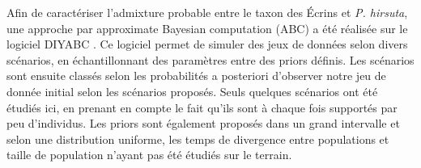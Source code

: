 Afin de caractériser l'admixture probable entre le taxon des Écrins et \textit{P. hirsuta}, une approche par approximate Bayesian computation (ABC) a été réalisée sur le logiciel DIYABC \citep{Cornuet2014}. 
Ce logiciel permet de simuler des jeux de données selon divers scénarios, en échantillonnant des paramètres entre des priors définis. 
Les scénarios sont ensuite classés selon les probabilités a posteriori d'observer notre jeu de donnée initial selon les scénarios proposés. 
Seuls quelques scénarios ont été étudiés ici, en prenant en compte le fait qu'ils sont à chaque fois supportés par peu d'individus. 
Les priors sont également proposés dans un grand intervalle et selon une distribution uniforme, les temps de divergence entre populations et taille de population n'ayant pas été étudiés sur le terrain.
